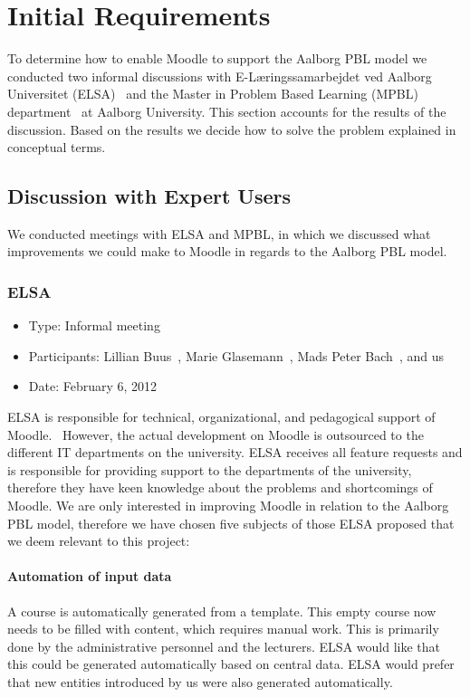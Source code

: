 \chapter{Initial Requirements}
\label{sec:initialAnalysis}
To determine how to enable Moodle to support the Aalborg PBL model we conducted two informal discussions with E-L\ae{}ringssamarbejdet ved Aalborg Universitet (ELSA)~\cite{elsa} and the Master in Problem Based Learning (MPBL) department~\cite{mpbl} at Aalborg University.
This section accounts for the results of the discussion.
Based on the results we decide how to solve the problem explained in conceptual terms.

\section{Discussion with Expert Users}  
\label{sub:expertUsers} 
We conducted meetings with ELSA and MPBL, in which we discussed what improvements we could make to Moodle in regards to the Aalborg PBL model.

\subsection{ELSA}
\label{sub:elsaInterview}
\begin{itemize}
	\item Type: Informal meeting
	\item Participants: Lillian Buus~\cite{lillian}, Marie Glasemann~\cite{marie}, Mads Peter Bach~\cite{mads}, and us 
	\item Date: February 6, 2012
\end{itemize}
ELSA is responsible for technical, organizational, and pedagogical support of Moodle.~\cite{elsa} 
However, the actual development on Moodle is outsourced to the different IT departments on the university. 
ELSA receives all feature requests and is responsible for providing support to the departments of the university, therefore they have keen knowledge about the problems and shortcomings of Moodle. 
We are only interested in improving Moodle in relation to the Aalborg PBL model, therefore we have chosen five subjects of those ELSA proposed that we deem relevant to this project:

\subsubsection{Automation of input data}
A course is automatically generated from a template. 
This empty course now needs to be filled with content, which requires manual work. 
This is primarily done by the administrative personnel and the lecturers. 
ELSA would like that this could be generated automatically based on central data. 
ELSA would prefer that new entities introduced by us were also generated automatically.


